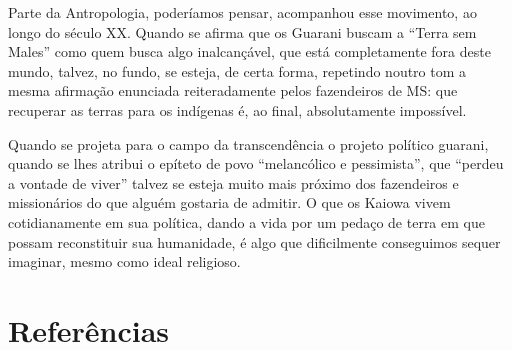 Parte da Antropologia, poderíamos pensar, acompanhou esse movimento, ao
longo do século XX. Quando se afirma que os Guarani buscam a ``Terra sem
Males'' como quem busca algo inalcançável, que está completamente fora
deste mundo, talvez, no fundo, se esteja, de certa forma, repetindo
noutro tom a mesma afirmação enunciada reiteradamente pelos fazendeiros
de MS: que recuperar as terras para os indígenas é, ao final,
absolutamente impossível.

Quando se projeta para o campo da transcendência o projeto político
guarani, quando se lhes atribui o epíteto de povo ``melancólico e
pessimista'', que ``perdeu a vontade de viver'' talvez se esteja muito
mais próximo dos fazendeiros e missionários do que alguém gostaria de
admitir. O que os Kaiowa vivem cotidianamente em sua política, dando a
vida por um pedaço de terra em que possam reconstituir sua humanidade,
é algo que dificilmente conseguimos sequer imaginar, mesmo como ideal
religioso.

\section{Referências}


